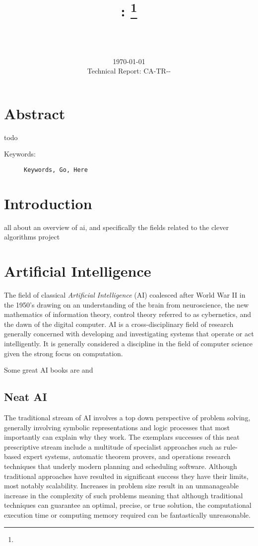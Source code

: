 \documentclass[a4paper, 11pt]{article}
\title{{\myreporttitle}: {\myreportsubtitle}\footnote{\myreportlicense}}
\author{\myreportauthor\\{\myreportemail}\\\small\myreportproject}
\date{\today\\{\small{Technical Report: CA-TR-{\myreportdate}-\myreportversion}}}
\begin{document}
\maketitle

\section*{Abstract} 
todo

\begin{description}
	\item[Keywords:] {\small\texttt{Keywords, Go, Here}}
\end{description} 

\section{Introduction}
\label{sec:introduction}

all about an overview of ai, and specifically the fields related to the clever algorithms project

% 
% 
\section{Artificial Intelligence}
\label{sec:artificial_intelligence}
The field of classical \emph{Artificial Intelligence} (AI) coalesced after World War II in the 1950's drawing on an understanding of the brain from neuroscience, the new mathematics of information theory, control theory referred to as cybernetics, and the dawn of the digital computer. AI is a cross-disciplinary field of research generally concerned with developing and investigating systems that operate or act intelligently. It is generally considered a discipline in the field of computer science given the strong focus on computation.

Some great AI books are \cite{Russell2009} and \cite{Luger1993}

\subsection{Neat AI}
The traditional stream of AI involves a top down perspective of problem solving, generally involving symbolic representations and logic processes that most importantly can explain why they work. The exemplars successes of this neat prescriptive stream include a multitude of specialist approaches such as rule-based expert systems, automatic theorem provers, and operations research techniques that underly modern planning and scheduling software. Although traditional approaches have resulted in significant success they have their limits, most notably scalability. Increases in problem size result in an unmanageable increase in the complexity of such problems meaning that although traditional techniques can guarantee an optimal, precise, or true solution, the computational execution time or computing memory required can be fantastically unreasonable.
\end{document}
